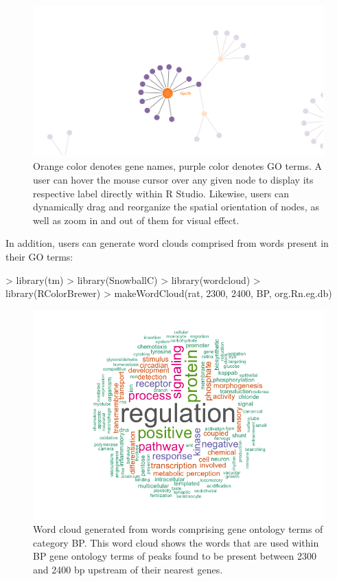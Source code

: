 \documentclass[12pt]{article}
\begin{document}
\begin{figure}[H]
\centering
\includegraphics{figures/vignette_network_Gprc5b.png}
\caption{Orange color denotes gene names, purple color denotes GO terms.  A user can hover the mouse cursor over any given node to display its respective label directly within R Studio.  Likewise, users can dynamically drag and reorganize the spatial orientation of nodes, as well as zoom in and out of them for visual effect.}
\end{figure}

In addition, users can generate word clouds comprised from words present in their GO terms:

\begin{Schunk}
\begin{Sinput}
> library(tm)
> library(SnowballC)
> library(wordcloud)
> library(RColorBrewer)
> makeWordCloud(rat, 2300, 2400, BP, org.Rn.eg.db)
\end{Sinput}
\end{Schunk}

\begin{figure}[H]
\centering
\includegraphics{figures/vignette_wordcloud.png}
\caption{Word cloud generated from words comprising gene ontology terms of category BP.  This word cloud shows the words that are used within BP gene ontology terms of peaks found to be present between 2300 and 2400 bp upstream of their nearest genes.}
\end{figure}
\end{document}
